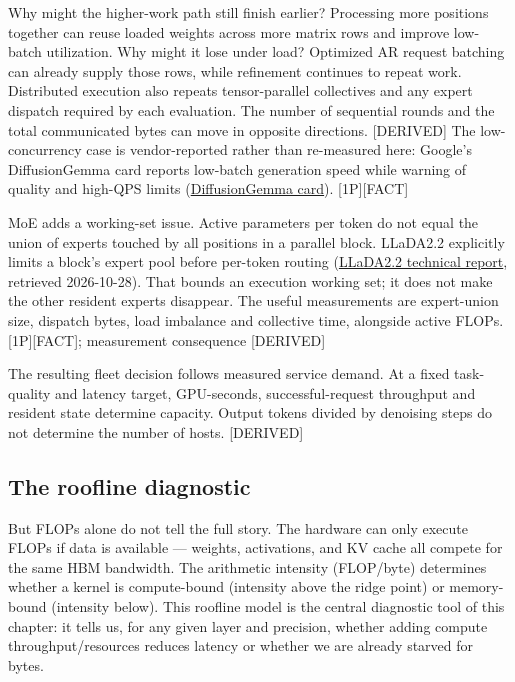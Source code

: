 Why might the higher-work path still finish earlier? Processing more
positions together can reuse loaded weights across more matrix rows and
improve low-batch utilization. Why might it lose under load? Optimized
AR request batching can already supply those rows, while refinement
continues to repeat work. Distributed execution also repeats
tensor-parallel collectives and any expert dispatch required by each
evaluation. The number of sequential rounds and the total communicated
bytes can move in opposite directions. \mbox{{[}DERIVED{]}} The low-concurrency
case is vendor-reported rather than re-measured here: Google's
DiffusionGemma card reports low-batch generation speed while warning of
quality and high-QPS limits
(\href{https://huggingface.co/google/diffusiongemma-26B-A4B-it/raw/f7f5b7f5fa82ffc52addd066915886d497f5517b/README.md}{DiffusionGemma
card}). \mbox{{[}1P{]}}\hspace{0pt}\mbox{{[}FACT{]}}

MoE adds a working-set issue. Active parameters per token do not equal
the union of experts touched by all positions in a parallel block.
LLaDA2.2 explicitly limits a block's expert pool before per-token
routing
(\href{https://raw.githubusercontent.com/inclusionAI/LLaDA2.X/main/LLaDA2_2_tech_report.pdf}{LLaDA2.2
technical report}, retrieved 2026-10-28). That bounds an execution
working set; it does not make the other resident experts disappear. The
useful measurements are expert-union size, dispatch bytes, load
imbalance and collective time, alongside active FLOPs.
\mbox{{[}1P{]}}\hspace{0pt}\mbox{{[}FACT{]}}; measurement consequence \mbox{{[}DERIVED{]}}

The resulting fleet decision follows measured service demand. At a fixed
task-quality and latency target, GPU-seconds, successful-request
throughput and resident state determine capacity. Output tokens divided
by denoising steps do not determine the number of hosts. \mbox{{[}DERIVED{]}}

\subsection{The roofline diagnostic}\label{the-roofline-diagnostic}

But FLOPs alone do not tell the full story. The hardware can only
execute FLOPs if data is available --- weights, activations, and KV
cache all compete for the same HBM bandwidth. The arithmetic intensity
(FLOP/byte) determines whether a kernel is compute-bound (intensity
above the ridge point) or memory-bound (intensity below). This roofline
model is the central diagnostic tool of this chapter: it tells us, for
any given layer and precision, whether adding compute
throughput/resources reduces latency or whether we are already starved
for bytes.

